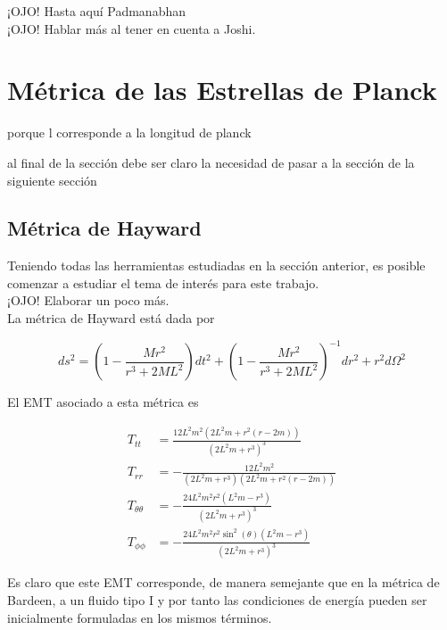 \documentclass{article}
\numberwithin{equation}{section}
\begin{document}
¡OJO! Hasta aquí Padmanabhan\\

¡OJO! Hablar más al tener en cuenta a Joshi.\\

\section{\label{metric planck stars} Métrica de las Estrellas de Planck}

porque l corresponde a la longitud de planck

al final de la sección debe ser claro la necesidad de pasar a la sección de la siguiente sección
\subsection{Métrica de Hayward}

Teniendo todas las herramientas estudiadas en la sección anterior, es posible comenzar a estudiar el tema de interés para este trabajo.\\

¡OJO! Elaborar un poco más.\\

La métrica de Hayward está dada por 

\begin{equation}
ds^2 = \left( 1 - \frac{Mr^2}{r^3 + 2ML^2} \right) dt^2 + \left( 1 - \frac{Mr^2}{r^3 + 2ML^2} \right)^{-1} dr^2 + r^2d\Omega ^2
\end{equation}

El EMT asociado a esta métrica es

\begin{equation}
\begin{split}
T_{tt} &= \frac{12 L^2 m^2 \left(2 L^2 m+r^2 (r-2 m)\right)}{\left(2 L^2 m+r^3\right)^3}\\
T_{rr} &= -\frac{12 L^2 m^2}{\left(2 L^2 m+r^3\right) \left(2 L^2 m+r^2 (r-2 m)\right)}\\
T_{\theta \theta} &= -\frac{24 L^2 m^2 r^2 \left(L^2 m-r^3\right)}{\left(2 L^2 m+r^3\right)^3}\\
T_{\phi \phi} &= -\frac{24 L^2 m^2 r^2 \sin ^2(\theta ) \left(L^2 m-r^3\right)}{\left(2 L^2 m+r^3\right)^3}
\end{split}
\end{equation}

Es claro que este EMT corresponde, de manera semejante que en la métrica de Bardeen, a un fluido tipo I y por tanto las condiciones de energía pueden ser inicialmente formuladas en los mismos términos.\\
\end{document}
